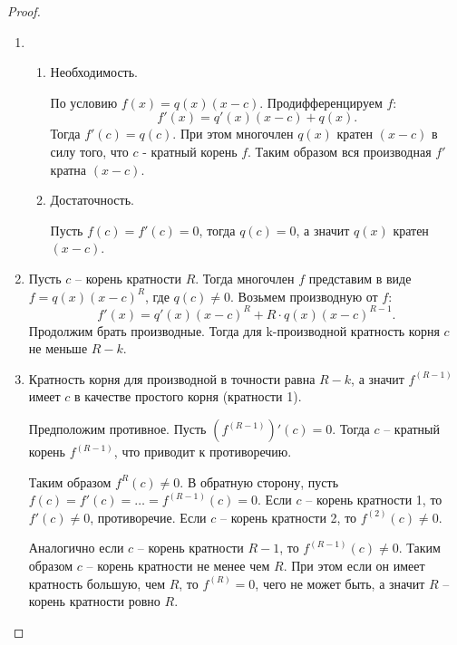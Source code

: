 \begin{proof}~
    \begin{enumerate}
        \item \begin{enumerate}
            \item Необходимость.
            
            По условию $f(x) = q(x) (x-c)$. Продифференцируем $f$:
            $$f'(x) = q'(x) (x-c) + q(x).$$ 
            Тогда $f'(c) = q(c)$. При этом многочлен $q(x)$ кратен $(x-c)$ в силу того, что $c$ - кратный корень $f$. 
            Таким образом вся производная $f'$ кратна $(x-c)$. 
            
            \item Достаточность.
            
            Пусть $f(c) = f'(c) = 0$, тогда $q(c) = 0$, а значит $q(x)$ кратен $(x-c)$.
            
        \end{enumerate}

        \item Пусть $c$ -- корень кратности $R$. Тогда многочлен $f$ представим в виде $f = q(x) (x-c)^R$, где $q(c) \neq 0$.
        Возьмем производную от $f$:
        $$f'(x) = q'(x) (x-c)^R + R \cdot q(x) (x-c)^{R-1}.$$ 
        Продолжим брать производные. Тогда для 
        k-производной кратность корня $c$ не меньше $R-k$.

        \item Кратность корня для производной в точности равна $R-k$, а значит $f^{(R-1)}$ имеет $c$ 
        в качестве простого корня (кратности 1). 
        
        Предположим противное. 
        Пусть $(f^{(R-1)})' (c) = 0$. Тогда $c$ -- кратный корень $f^{(R-1)}$, что приводит к противоречию.

        Таким образом $f^{R}(c) \neq 0$. В обратную сторону, пусть 
        $f(c) = f'(c) = \dots = f^{(R-1)} (c) = 0$. Если $c$ -- корень кратности 1, то $f'(c) \neq 0$, 
        противоречие. Если $c$ -- корень кратности 2, то $f^{(2)} (c) \neq 0$. 
        
        Аналогично если $c$ -- 
        корень кратности $R-1$, то $f^{(R-1)} (c) \neq 0$. Таким образом $c$ -- корень кратности не 
        менее чем $R$. При этом если он имеет кратность большую, чем $R$, то $f^{(R)} = 0$, чего не 
        может быть, а значит $R$ -- корень кратности ровно $R$.
    \end{enumerate}
\end{proof}

